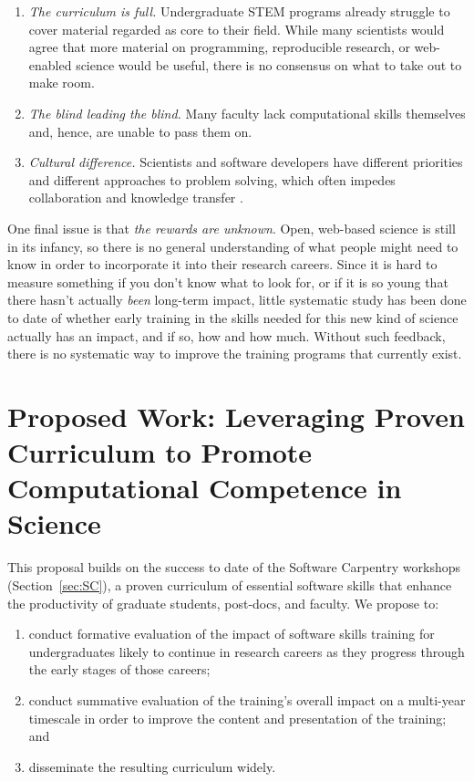 \documentclass{proposalnsf}
\begin{document}
\begin{enumerate}

\item
  \emph{The curriculum is full.}  Undergraduate STEM programs already
  struggle to cover material regarded as core to their field.  While
  many scientists would agree that more material on programming,
  reproducible research, or web-enabled science would be useful, there
  is no consensus on what to take out to make room.

\item
  \emph{The blind leading the blind.}  Many faculty lack computational
  skills themselves and, hence, are unable to pass them on.

\item
  \emph{Cultural difference.}  Scientists and software developers have
  different priorities and different approaches to problem solving,
  which often impedes collaboration and knowledge transfer
  \cite{segal2005a}.

\end{enumerate}

One final issue is that \emph{the rewards are unknown}.  Open,
web-based science is still in its infancy, so there is no general
understanding of what people might need to know in order to
incorporate it into their research careers.  Since it is hard to
measure something if you don't know what to look for, or if it is so
young that there hasn't actually \emph{been} long-term impact, little
systematic study has been done to date of whether early training in
the skills needed for this new kind of science actually has an impact,
and if so, how and how much.  Without such feedback, there is no
systematic way to improve the training programs that currently exist.

\section{Proposed Work: Leveraging Proven Curriculum to Promote Computational Competence in Science}

This proposal builds on the success to date of the Software Carpentry
workshops (Section~\ref{sec:SC}), a proven curriculum of essential
software skills that enhance the productivity of graduate students,
post-docs, and faculty.  We propose to:

\begin{enumerate}

\item
  conduct formative evaluation of the impact of software skills
  training for undergraduates likely to continue in research careers
  as they progress through the early stages of those careers;

\item
  conduct summative evaluation of the training's overall impact on a
  multi-year timescale in order to improve the content and
  presentation of the training; and

\item
  disseminate the resulting curriculum widely.

\end{enumerate}
\end{document}
